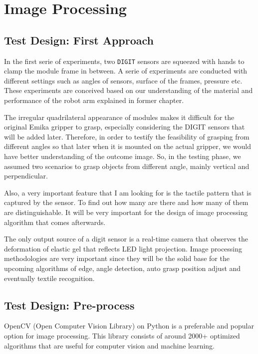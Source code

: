\section{Image Processing}
\subsection{Test Design: First Approach}
In the first serie of experiments, two \texttt{DIGIT} sensors are squeezed with hands to clamp the module frame in between. A serie of experiments are conducted with different settings such as angles of sensors, surface of the frames, pressure etc. These experiments are conceived based on our understanding of the material and performance of the robot arm explained in former chapter. 

The irregular quadrilateral appearance of modules makes it difficult for the original Emika gripper to grasp, especially considering the DIGIT sensors that will be added later. Therefore, in order to testify the feasibility of grasping from different angles so that later when it is mounted on the actual gripper, we would have better understanding of the outcome image. So, in the testing phase, we assumed two scenarios to grasp objects from different angle, mainly vertical and perpendicular.

Also, a very important feature that I am looking for is the tactile pattern that is captured by the sensor. To find out how many are there and how many of them are distinguishable. It will be very important for the design of image processing algorithm that comes afterwards.

The only output source of a digit sensor is a real-time camera that observes the deformation of elastic gel that reflects LED light projection. Image processing methodologies are very important since they will be the solid base for the upcoming algorithms of edge, angle detection, auto grasp position adjust and eventually textile recognition.

\subsection{Test Design: Pre-process}
OpenCV (Open Computer Vision Library) on Python is a preferable and popular option for image processing. This library consists of around 2000+ optimized algorithms that are useful for computer vision and machine learning. 

